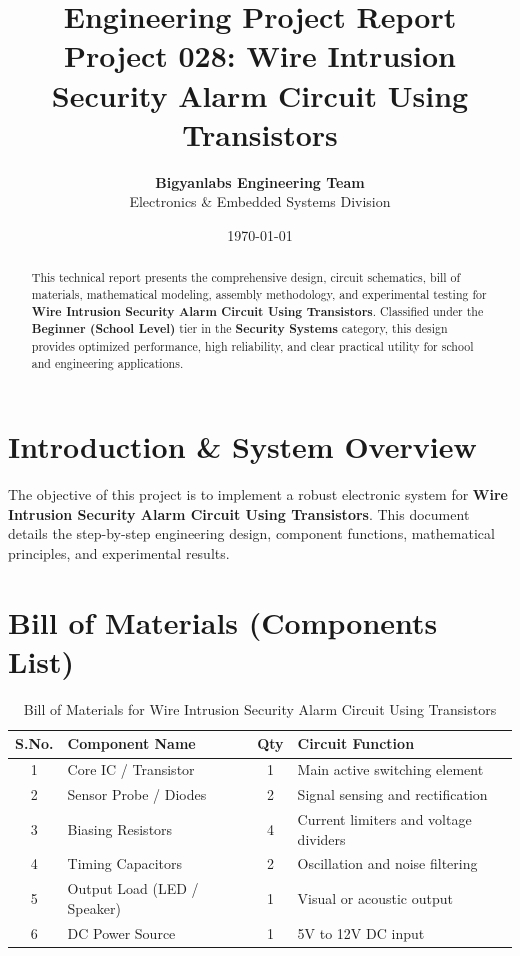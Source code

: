 \documentclass[11pt,a4paper]{article}
\title{\textbf{\Huge Engineering Project Report}\\[0.5em] \Large Project 028: Wire Intrusion Security Alarm Circuit Using Transistors}
\author{\textbf{Bigyanlabs Engineering Team}\\ Electronics \& Embedded Systems Division}
\date{\today}
\begin{document}
\maketitle
\thispagestyle{empty}

\begin{abstract}
This technical report presents the comprehensive design, circuit schematics, bill of materials, mathematical modeling, assembly methodology, and experimental testing for \textbf{Wire Intrusion Security Alarm Circuit Using Transistors}. Classified under the \textbf{Beginner (School Level)} tier in the \textbf{Security Systems} category, this design provides optimized performance, high reliability, and clear practical utility for school and engineering applications.
\end{abstract}

\newpage
\tableofcontents
\newpage

\section{Introduction \& System Overview}
The objective of this project is to implement a robust electronic system for \textbf{Wire Intrusion Security Alarm Circuit Using Transistors}. This document details the step-by-step engineering design, component functions, mathematical principles, and experimental results.

\section{Bill of Materials (Components List)}
\begin{table}[h!]
\centering
\caption{Bill of Materials for Wire Intrusion Security Alarm Circuit Using Transistors}
\vspace{0.5em}
\begin{tabular}{clcp{7cm}}
\toprule
\textbf{S.No.} & \textbf{Component Name} & \textbf{Qty} & \textbf{Circuit Function} \\
\midrule
1 & Core IC / Transistor & 1 & Main active switching element \\
2 & Sensor Probe / Diodes & 2 & Signal sensing and rectification \\
3 & Biasing Resistors & 4 & Current limiters and voltage dividers \\
4 & Timing Capacitors & 2 & Oscillation and noise filtering \\
5 & Output Load (LED / Speaker) & 1 & Visual or acoustic output \\
6 & DC Power Source & 1 & 5V to 12V DC input \\
\bottomrule
\end{tabular}
\end{table}
\end{document}
